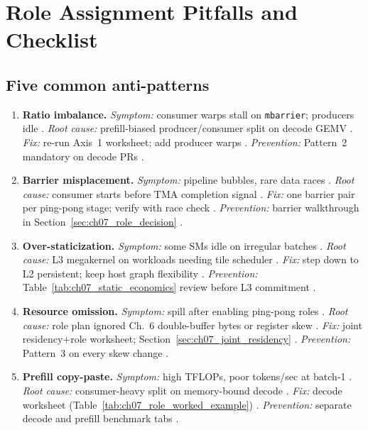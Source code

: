 \section{Role Assignment Pitfalls and Checklist}
\label{sec:ch07_role_pitfalls}

\subsection{Five common anti-patterns}
\begin{enumerate}
\item \textbf{Ratio imbalance.}
\emph{Symptom:} consumer warps stall on \texttt{mbarrier}; producers idle \citep{shah2024flashattention3,patel2025llminference}.
\emph{Root cause:} prefill-biased producer/consumer split on decode GEMV \citep{taxbreak2026,memoryfloor2026}.
\emph{Fix:} re-run Axis~1 worksheet; add producer warps \citep{yirage2026}.
\emph{Prevention:} Pattern~2 mandatory on decode PRs \citep{shah2024flashattention3,chen2020compilerbasedhardw}.

\item \textbf{Barrier misplacement.}
\emph{Symptom:} pipeline bubbles, rare data races \citep{semianalysis2024tma,nvidia2022hopper}.
\emph{Root cause:} consumer starts before TMA completion signal \citep{shah2024flashattention3}.
\emph{Fix:} one barrier pair per ping-pong stage; verify with race check \citep{yirage2026}.
\emph{Prevention:} barrier walkthrough in Section~\ref{sec:ch07_role_decision} \citep{semianalysis2024tma,patel2025llminference}.

\item \textbf{Over-staticization.}
\emph{Symptom:} some SMs idle on irregular batches \citep{shah2024flashattention3,mpk2025}.
\emph{Root cause:} L3 megakernel on workloads needing tile scheduler \citep{patel2025llminference}.
\emph{Fix:} step down to L2 persistent; keep host graph flexibility \citep{nvidia2024cudagraphs}.
\emph{Prevention:} Table~\ref{tab:ch07_static_economics} review before L3 commitment \citep{mpk2025,yirage2026}.

\item \textbf{Resource omission.}
\emph{Symptom:} spill after enabling ping-pong roles \citep{memoryfloor2026,yirage2026}.
\emph{Root cause:} role plan ignored Ch.~6 double-buffer bytes or register skew \citep{dao2022flashattention,chen2020compilerbasedhardw}.
\emph{Fix:} joint residency+role worksheet; Section~\ref{sec:ch07_joint_residency} \citep{yirage2026,shah2024flashattention3}.
\emph{Prevention:} Pattern~3 on every skew change \citep{wu2024mirage,mpk2025}.

\item \textbf{Prefill copy-paste.}
\emph{Symptom:} high TFLOPs, poor tokens/sec at batch-1 \citep{shah2024flashattention3,taxbreak2026}.
\emph{Root cause:} consumer-heavy split on memory-bound decode \citep{memoryfloor2026,patel2025llminference}.
\emph{Fix:} decode worksheet (Table~\ref{tab:ch07_role_worked_example}) \citep{yirage2026}.
\emph{Prevention:} separate decode and prefill benchmark tabs \citep{kwon2023vllm,shah2024flashattention3}.
\end{enumerate}

